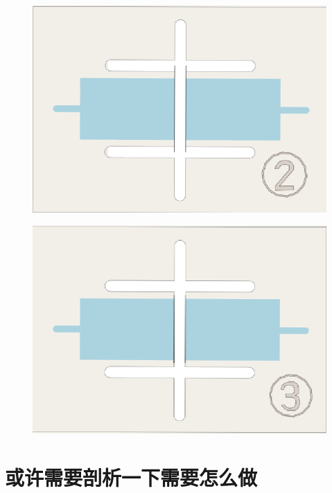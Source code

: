 \documentclass{beamer}
\begin{document}
\begin{frame}
    \begin{figure}[htpb]
        \centering
        \includegraphics[width=1\linewidth]{figure/plot2.png}
    \end{figure}
\end{frame}

\begin{frame}
    \begin{figure}[htpb]
        \centering
        \includegraphics[width=1\linewidth]{figure/plot3.png}
    \end{figure}
\end{frame}

\section{或许需要剖析一下需要怎么做}
\end{document}
